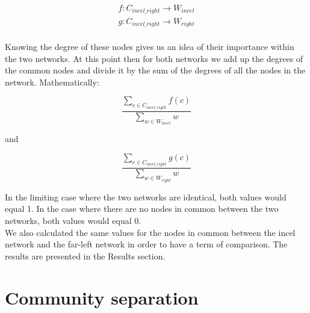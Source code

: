 \documentclass[a4paper,twoside,12pt, openany]{book}
\begin{document}
\begin{align*}
f: C_{incel\_right} \to W_{incel}\\
g: C_{incel\_right} \to W_{right}\\
\end{align*}


Knowing the degree of these nodes gives us an idea of their importance within the two networks. At this point then for both networks we add up the degrees of the common nodes and divide it by the sum of the degrees of all the nodes in the network. Mathematically: 

$$ \frac{
	\sum\limits_{c\in C_{incel\_right}} f(c)
	}
	{
		\sum\limits_{w\in W_{incel}} w
		} $$

and

$$ \frac{
	\sum\limits_{c\in C_{incel\_right}} g(c)
}
{
	\sum\limits_{w\in W_{right}} w
} $$

In the limiting case where the two networks are identical, both values would equal 1. In the case where there are no nodes in common between the two networks, both values would equal 0. \\
We also calculated the same values for the nodes in common between the incel network and the far-left network in order to have a term of comparison. The results are presented in the Results section.

\section{Community separation}
\label{ch:com_sep}
\end{document}
